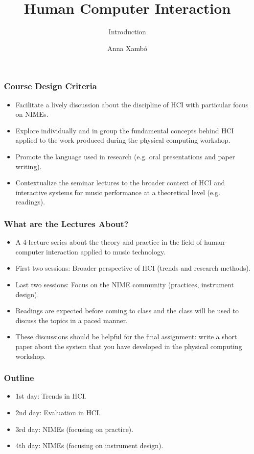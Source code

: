 \documentclass[screen, aspectratio=43]{beamer}
\title[HCI-intro]{Human Computer Interaction}
\subtitle{Introduction}
\author[A. Xamb{\'o}]{Anna Xamb{\'o}}
\institute[NTNU]{Department of Music, NTNU}
\begin{document}
\begin{frame}
  \titlepage
\end{frame}


\begin{frame}
\frametitle{Course Design Criteria}
\begin{itemize}
\item Facilitate a lively discussion about the discipline of HCI with particular focus on NIMEs.
\item Explore individually and in group the fundamental concepts behind HCI applied to the work produced during the physical computing workshop.
\item Promote the language used in research (e.g. oral presentations and paper writing).
\item Contextualize the seminar lectures to the broader context of HCI and interactive systems for music performance at a theoretical level (e.g. readings).
\end{itemize}
\end{frame}
%
\begin{frame}
\frametitle{What are the Lectures About?}
\begin{itemize}
\item A 4-lecture series about the theory and practice in the field of human-computer interaction applied to music technology.
\item First two sessions: Broader perspective of HCI (trends and research methods).
\item Last two sessions: Focus on the NIME community (practices, instrument design).
\item Readings are expected before coming to class and the class will be used to discuss the topics in a paced manner.
\item These discussions should be helpful for the final assignment: write a short paper about the system that you have developed in the physical computing workshop.
\end{itemize}
\end{frame}
%
\begin{frame}
\frametitle{Outline}
\begin{itemize}
\item 1st day: Trends in HCI.
\item 2nd day: Evaluation in HCI.
\item 3rd day: NIMEs (focusing on practice).
\item 4th day: NIMEs (focusing on instrument design).
\end{itemize}
\end{frame}
\end{document}
